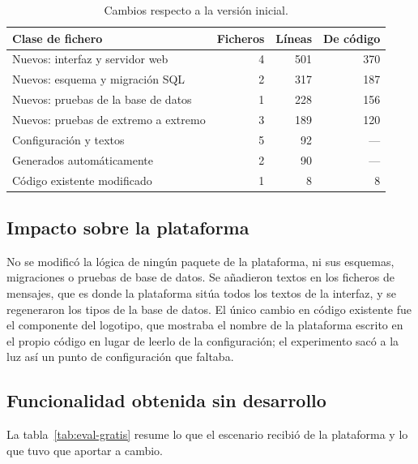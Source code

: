 \begin{table}[htbp]
  \centering
  \footnotesize
  \caption{Cambios respecto a la versión inicial.}
  \label{tab:eval-cambios}
  \begin{tabularx}{\textwidth}{@{}Xrrr@{}}
    \toprule
    \textbf{Clase de fichero} & \textbf{Ficheros} & \textbf{Líneas} & \textbf{De código} \\
    \midrule
    Nuevos: interfaz y servidor web & 4 & 501 & 370 \\
    Nuevos: esquema y migración SQL & 2 & 317 & 187 \\
    Nuevos: pruebas de la base de datos & 1 & 228 & 156 \\
    Nuevos: pruebas de extremo a extremo & 3 & 189 & 120 \\
    Configuración y textos & 5 & 92 & --- \\
    Generados automáticamente & 2 & 90 & --- \\
    Código existente modificado & 1 & 8 & 8 \\
    \bottomrule
  \end{tabularx}
\end{table}

\subsection{Impacto sobre la plataforma}

No se modificó la lógica de ningún paquete de la plataforma, ni sus
esquemas, migraciones o pruebas de base de datos. Se añadieron textos en los
ficheros de mensajes, que es donde la plataforma sitúa todos los textos de
la interfaz, y se regeneraron los tipos de la base de datos. El único cambio
en código existente fue el componente del logotipo, que mostraba el nombre
de la plataforma escrito en el propio código en lugar de leerlo de la
configuración; el experimento sacó a la luz así un punto de configuración
que faltaba.

\subsection{Funcionalidad obtenida sin desarrollo}

La tabla~\ref{tab:eval-gratis} resume lo que el escenario recibió de la
plataforma y lo que tuvo que aportar a cambio.

